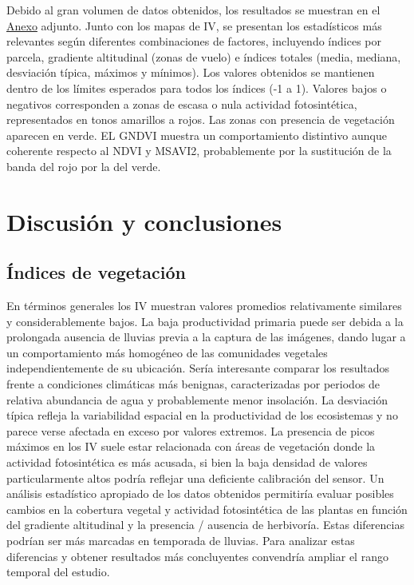 \documentclass[spanish,openany]{article}
\begin{document}
Debido al gran volumen de datos obtenidos, los resultados se muestran en
el \protect\hyperlink{appendix}{Anexo} adjunto. Junto con los mapas de
IV, se presentan los estadísticos más relevantes según diferentes
combinaciones de factores, incluyendo índices por parcela, gradiente
altitudinal (zonas de vuelo) e índices totales (media, mediana,
desviación típica, máximos y mínimos). Los valores obtenidos se
mantienen dentro de los límites esperados para todos los índices (-1 a
1). Valores bajos o negativos corresponden a zonas de escasa o nula
actividad fotosintética, representados en tonos amarillos a rojos. Las
zonas con presencia de vegetación aparecen en verde. EL GNDVI muestra un
comportamiento distintivo aunque coherente respecto al NDVI y MSAVI2,
probablemente por la sustitución de la banda del rojo por la del verde.

\section{Discusión y conclusiones}\label{discusion-y-conclusiones}

\subsection{Índices de vegetación}\label{indices-de-vegetacion-1}

En términos generales los IV muestran valores promedios relativamente
similares y considerablemente bajos. La baja productividad primaria
puede ser debida a la prolongada ausencia de lluvias previa a la captura
de las imágenes, dando lugar a un comportamiento más homogéneo de las
comunidades vegetales independientemente de su ubicación. Sería
interesante comparar los resultados frente a condiciones climáticas más
benignas, caracterizadas por periodos de relativa abundancia de agua y
probablemente menor insolación. La desviación típica refleja la
variabilidad espacial en la productividad de los ecosistemas y no parece
verse afectada en exceso por valores extremos. La presencia de picos
máximos en los IV suele estar relacionada con áreas de vegetación donde
la actividad fotosintética es más acusada, si bien la baja densidad de
valores particularmente altos podría reflejar una deficiente calibración
del sensor. Un análisis estadístico apropiado de los datos obtenidos
permitiría evaluar posibles cambios en la cobertura vegetal y actividad
fotosintética de las plantas en función del gradiente altitudinal y la
presencia / ausencia de herbivoría. Estas diferencias podrían ser más
marcadas en temporada de lluvias. Para analizar estas diferencias y
obtener resultados más concluyentes convendría ampliar el rango temporal
del estudio.
\end{document}
